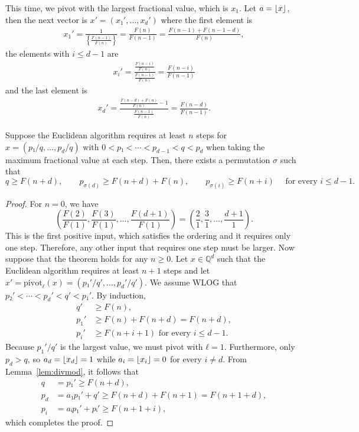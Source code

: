 This time, we pivot with the largest fractional value, which is $x_1$.
Let $a = \lfloor x\rfloor$, then the next vector is $x' = (x₁', …, x_d')$ where
the first element is
\begin{align*}
  x_1'
  = \frac{1}{\left\{\frac{F(n-1)}{F(n)}\right\}}
  = \frac{F(n)}{F(n-1)}
  = \frac{F(n-1) + F(n-1-d)}{F(n)},
\end{align*}
the elements with $i ≤ d - 1$ are
\begin{align*}
  x_i'
  = \frac{\frac{F(n-i)}{F(n)}}{\frac{F(n-1)}{F(n)}}
  = \frac{F(n-i)}{F(n-1)}
\end{align*}
and the last element is
\begin{align*}
  x_d'
  = \frac{\frac{F(n-d) + F(n)}{F(n)} - 1}{\frac{F(n-1)}{F(n)}}
  = \frac{F(n-d)}{F(n-1)}.
\end{align*}

\begin{theorem}
  Suppose the Euclidean algorithm requires at least $n$ steps for $x = (p₁/q, …, p_d/q)$
  with $0 < p₁ < ⋯ < p_{d-1} < q < p_d$ when taking the maximum fractional value at each step.
  Then, there exists a permutation $σ$ such that
  \[
    q ≥ F(n+d),
    \qquad
    p_{σ(d)} ≥ F(n + d) + F(n),
    \qquad
    p_{σ(i)} ≥ F(n + i)
    \quad
    \text{ for every } i ≤ d - 1.
  \]
\end{theorem}

\begin{proof}
  For $n = 0$, we have
  \[
    \left(\frac{F(2)}{F(1)}, \frac{F(3)}{F(1)}, …, \frac{F(d+1)}{F(1)} \right)
    = \left(\frac{2}{1}, \frac{3}{1}, …, \frac{d+1}{1} \right).
  \]
  This is the first positive input, which satisfies the ordering and it requires only one step.
  Therefore, any other input that requires one step must be larger.
  Now suppose that the theorem holds for any $n ≥ 0$.
  Let $x ∈ ℚ^d$ such that the Euclidean algorithm requires at least $n+1$ steps
  and let $x' = \mathrm{pivot}_ℓ(x) = (p₁'/q', …, p_d'/q')$.
  We assume WLOG that $p₂' < ⋯ < p_d' < q' < p₁'$.
  By induction,
  \begin{align*}
    q'   & ≥ F(n),                     \\
    p_1' & ≥ F(n) + F(n + d) = F(n+d), \\
    p_i' & ≥ F(n + i + 1)
    \text{ for every } i ≤ d - 1.
  \end{align*}
  Because $p_1'/q'$ is the largest value, we must pivot with $ℓ = 1$.
  Furthermore, only $p_d > q$, so $a_d = \lfloor x_d\rfloor = 1$ while $a_i =
  \lfloor x_i\rfloor = 0$ for every $i ≠ d$.
  From Lemma~\ref{lem:divmod}, it follows that
  \begin{align*}
    q   & = p₁'
          ≥ F(n + d), \\
    p_d & = a₁ p₁' + q'
          ≥ F(n + d) + F(n + 1) = F(n + 1 + d), \\
    p_i & = aᵢ p₁' + pᵢ'
          ≥ F(n + 1 + i),
  \end{align*}
  which completes the proof.
\end{proof}

